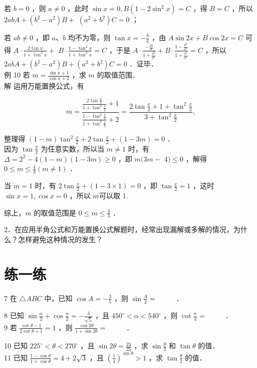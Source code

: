 \documentclass[10pt]{article}
\begin{document}
若 \(b=0\) ，则 \(a \neq 0\) ，此时 \(\sin x=0, B\left(1-2 \sin ^{2} x\right)=C\) ，得 \(B=C\) ，所以 \(2 a b A+\left(b^{2}-a^{2}\right) B+\) \(\left(a^{2}+b^{2}\right) C=0\) ；

若 \(a b \neq 0\) ，即 \(a 、 b\) 均不为零，则 \(\tan x=-\frac{b}{a}\) ，由 \(A \sin 2 x+B \cos 2 x=C\) 可得 \(A \cdot \frac{2 \tan x}{1+\tan ^{2} x}+\) \(B \cdot \frac{1-\tan ^{2} x}{1+\tan ^{2} x}=C\) ，于是 \(A \cdot \frac{-\frac{2 b}{a}}{1+\frac{b^{2}}{a^{2}}}+B \cdot \frac{1-\frac{b^{2}}{a^{2}}}{1+\frac{b^{2}}{a^{2}}}=C\) ，所以 \(2 a b A+\left(b^{2}-a^{2}\right) B+\left(a^{2}+b^{2}\right) C=0\) ．证毕．\\
例 10 若 \(m=\frac{\sin x+1}{\cos x+2}\) ，求 \(m\) 的取值范围．\\
解 运用万能置换公式，有

\[
m=\frac{\frac{2 \tan \frac{x}{2}}{1+\tan ^{2} \frac{x}{2}}+1}{\frac{1-\tan ^{2} \frac{x}{2}}{1+\tan ^{2} \frac{x}{2}}+2}=\frac{2 \tan \frac{x}{2}+1+\tan ^{2} \frac{x}{2}}{3+\tan ^{2} \frac{x}{2}},
\]

整理得 \((1-m) \tan ^{2} \frac{x}{2}+2 \tan \frac{x}{2}+(1-3 m)=0\) ．\\
因为 \(\tan \frac{x}{2}\) 为任意实数，所以当 \(m \neq 1\) 时，有 \(\Delta=2^{2}-4(1-m)(1-3 m) \geqslant 0\) ，即 \(m(3 m-\) \(4) \leqslant 0\) ，解得 \(0 \leqslant m \leqslant \frac{4}{3}(m \neq 1)\) ．

当 \(m=1\) 时，有 \(2 \tan \frac{x}{2}+(1-3 \times 1)=0\) ，即 \(\tan \frac{x}{2}=1\) ，这时 \(\sin x=1, \cos x=0\) ，所以 \(m\)可以取 1.

综上，\(m\) 的取值范围是 \(0 \leqslant m \leqslant \frac{4}{3}\) ．

2．在应用半角公式和万能置换公式解题时，经常出现漏解或多解的情况，为什么？怎样避免这种情况的发生？

\section*{练一练}
7 在 \(\triangle A B C\) 中，已知 \(\cos A=-\frac{3}{5}\) ，则 \(\sin \frac{A}{2}=\) \(\qquad\) ．

8 已知 \(\sin \frac{\alpha}{2}+\cos \frac{\alpha}{2}=-\frac{3}{\sqrt{5}}\) ，且 \(450^{\circ}<\alpha<540^{\circ}\) ，则 \(\cot \frac{\alpha}{4}=\) \(\qquad\) ．\\
9 若 \(\frac{\cot \theta-1}{2 \cot \theta+1}=1\) ，则 \(\frac{\cos 2 \theta}{1+\sin 2 \theta}=\) \(\qquad\) ．

10 已知 \(225^{\circ}<\theta<270^{\circ}\) ，且 \(\sin 2 \theta=\frac{24}{25}\) ，求 \(\sin \frac{\theta}{2}\) 和 \(\tan \theta\) 的值．\\
11 已知 \(\frac{1-\cos \theta}{1+\cos \theta}=4+2 \sqrt{3}\) ，且 \(\left(\frac{1}{4}\right)^{\sin \theta}>1\) ，求 \(\tan \frac{\theta}{2}\) 的值．
\end{document}
